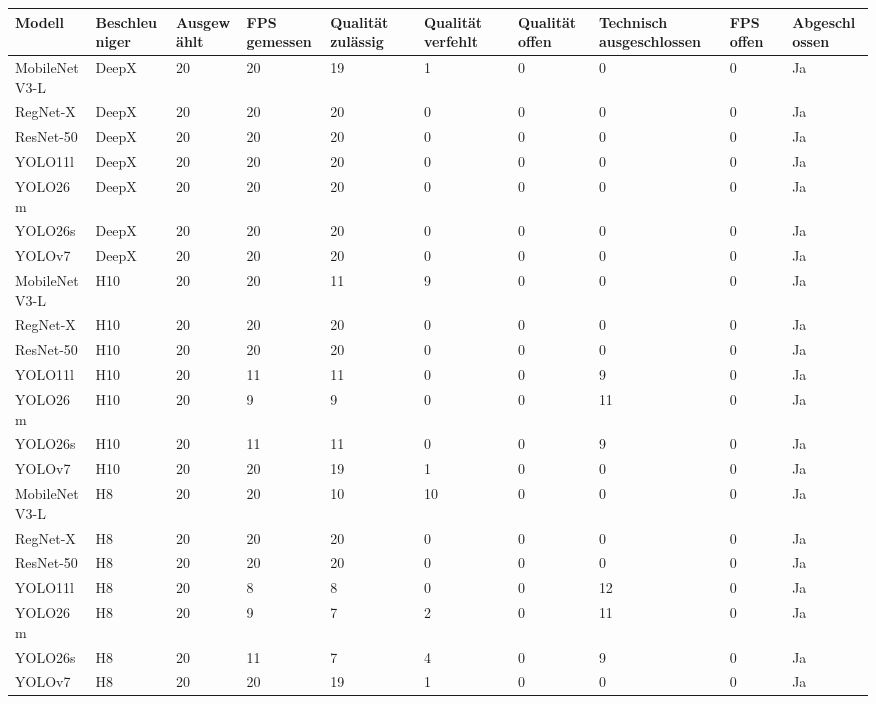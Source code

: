 \begin{tabular}{@{}llllllllll@{}}
\toprule
Modell & Beschleuniger & Ausgewählt & FPS gemessen & Qualität zulässig & Qualität verfehlt & Qualität offen & Technisch ausgeschlossen & FPS offen & Abgeschlossen \\
\midrule
MobileNetV3-L & DeepX & 20 & 20 & 19 & 1 & 0 & 0 & 0 & Ja \\
RegNet-X & DeepX & 20 & 20 & 20 & 0 & 0 & 0 & 0 & Ja \\
ResNet-50 & DeepX & 20 & 20 & 20 & 0 & 0 & 0 & 0 & Ja \\
YOLO11l & DeepX & 20 & 20 & 20 & 0 & 0 & 0 & 0 & Ja \\
YOLO26m & DeepX & 20 & 20 & 20 & 0 & 0 & 0 & 0 & Ja \\
YOLO26s & DeepX & 20 & 20 & 20 & 0 & 0 & 0 & 0 & Ja \\
YOLOv7 & DeepX & 20 & 20 & 20 & 0 & 0 & 0 & 0 & Ja \\
MobileNetV3-L & H10 & 20 & 20 & 11 & 9 & 0 & 0 & 0 & Ja \\
RegNet-X & H10 & 20 & 20 & 20 & 0 & 0 & 0 & 0 & Ja \\
ResNet-50 & H10 & 20 & 20 & 20 & 0 & 0 & 0 & 0 & Ja \\
YOLO11l & H10 & 20 & 11 & 11 & 0 & 0 & 9 & 0 & Ja \\
YOLO26m & H10 & 20 & 9 & 9 & 0 & 0 & 11 & 0 & Ja \\
YOLO26s & H10 & 20 & 11 & 11 & 0 & 0 & 9 & 0 & Ja \\
YOLOv7 & H10 & 20 & 20 & 19 & 1 & 0 & 0 & 0 & Ja \\
MobileNetV3-L & H8 & 20 & 20 & 10 & 10 & 0 & 0 & 0 & Ja \\
RegNet-X & H8 & 20 & 20 & 20 & 0 & 0 & 0 & 0 & Ja \\
ResNet-50 & H8 & 20 & 20 & 20 & 0 & 0 & 0 & 0 & Ja \\
YOLO11l & H8 & 20 & 8 & 8 & 0 & 0 & 12 & 0 & Ja \\
YOLO26m & H8 & 20 & 9 & 7 & 2 & 0 & 11 & 0 & Ja \\
YOLO26s & H8 & 20 & 11 & 7 & 4 & 0 & 9 & 0 & Ja \\
YOLOv7 & H8 & 20 & 20 & 19 & 1 & 0 & 0 & 0 & Ja \\
\bottomrule
\end{tabular}
